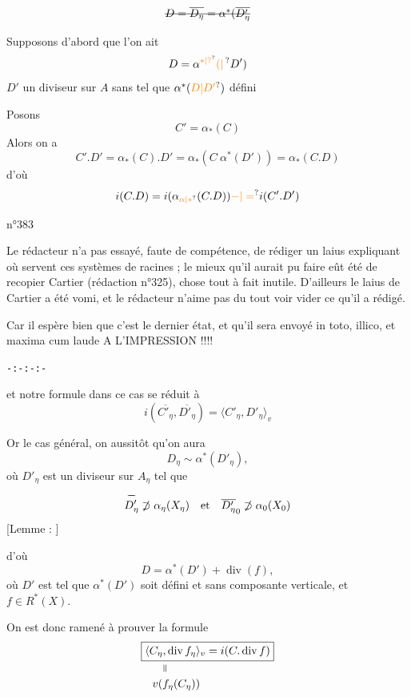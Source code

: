 \[
\deleted{D=\overline{D_{\eta}}=\alpha^*(\overline{D'_{\eta}}}
\]

Supposons d'abord que l'on ait
\[
D=\alpha^{\unsure{*|?}}\unsure{(|\,}D')
\]
$D'$ un diviseur sur $A$ sans  tel que $\alpha^{*}(\unsure{D|D'})$ défini

Posons
\[
C'=\alpha_*(C)
\]
Alors on a
\[
C'.D'=\alpha_*(C).D'=\alpha_*(C\ \alpha^*(D'))=\alpha_*(C.D)
\]
d'où
\[
i(C.D)=i(\alpha_{\unsure{\alpha|*}}(C.D))\unsure{-|=}i(C'.D')
\]

\hfill n°383

Le rédacteur n'a pas essayé, faute de compétence, de rédiger un laius expliquant où servent ces systèmes de racines ; le mieux qu'il aurait pu faire eût été de recopier Cartier (rédaction n°325), chose tout à fait inutile. D'ailleurs le laius de Cartier a été vomi, et le rédacteur n'aime pas du tout voir vider ce qu'il a rédigé.

Car il espère bien que c'est le dernier état, et qu'il sera envoyé in toto, illico, et maxima cum laude A L'IMPRESSION !!!!

\begin{center}\texttt{-:-:-:-}\end{center}

et notre formule dans ce cas se réduit à
\[
\boxed{i(\overline{C'_{\eta}},\overline{D'_{\eta}})=
 \langle C'_{\eta},D'_{\eta}\rangle_v}
\]

Or  le cas général, on  aussitôt qu'on aura
\[
D_{\eta}\sim\alpha^*(D'_{\eta}),
\]
où $D'_{\eta}$ est un diviseur sur $A_{\eta}$ tel que
\[
{\overset{\deleted{-}}{D'_{\eta}}}\not\supset\alpha_{\eta}(X_{\eta})
\quad\text{et}\quad
{\overline{D'_{\eta}}}_0\not\supset\alpha_0(X_0)
\]
[Lemme : ]

d'où
\[
D=\alpha^*(D')+\operatorname{div}(f),
\]
où $D'$ est tel que $\alpha^*(D')$ soit défini et sans composante verticale, et $f\in R^*(X)$. 

On est donc ramené à prouver la formule
\[
\begin{aligned}
&\boxed{\langle C_{\eta},\operatorname{div}f_{\eta}\rangle_v=i(C.\operatorname{div}f)}\\[-2pt]
&\qquad\rotatebox{90}{$=$}\\[-2pt]
&\quad v(f_{\eta}(C_{\eta}))
\end{aligned}
\]

